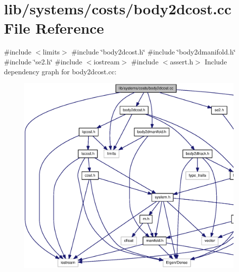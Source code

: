 \section{lib/systems/costs/body2dcost.cc \-File \-Reference}
\label{body2dcost_8cc}
{\ttfamily \#include $<$limits$>$}\*
{\ttfamily \#include \char`\"{}body2dcost.\-h\char`\"{}}\*
{\ttfamily \#include \char`\"{}body2dmanifold.\-h\char`\"{}}\*
{\ttfamily \#include \char`\"{}se2.\-h\char`\"{}}\*
{\ttfamily \#include $<$iostream$>$}\*
{\ttfamily \#include $<$assert.\-h$>$}\*
\-Include dependency graph for body2dcost.\-cc\-:\nopagebreak
\begin{figure}[H]
\begin{center}
\leavevmode
\includegraphics[width=350pt]{body2dcost_8cc__incl}
\end{center}
\end{figure}
